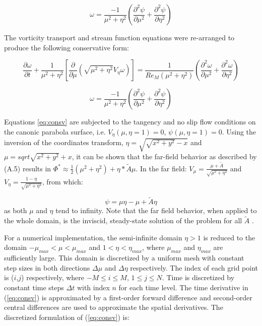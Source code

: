 \documentclass{article}
\newcommand{\pd}{\partial}
\begin{document}
\begin{equation}
\omega = \frac{-1}{\mu^2 + \eta^2} \left(\frac{\pd^2 \psi}{\pd \mu^2} + \frac{\pd^2 \psi}{\pd \eta^2} \right)
\end{equation}

The vorticity transport and stream function equations were re-arranged to produce the following conservative form:

\[
\frac{\pd \omega}{\pd t} + \frac{1}{\mu^2 + \eta^2} \left[\frac{\pd}{\pd \mu} \left(\sqrt{\mu^2 + \eta^2} V_\eta \omega \right) \right] = \frac{1}{Re_M(\mu^2 + \eta^2)} \left(\frac{\pd^2 \omega}{\pd \mu^2} + \frac{\pd^2 \omega}{\pd \eta^2} \right)
\]

\begin{equation}
\omega = \frac{-1}{\mu^2 + \eta^2} \left(\frac{\pd^2 \psi}{\pd \mu^2} + \frac{\pd^2 \psi}{\pd \eta^2} \right)
\label{eq:consv}
\end{equation}

Equations \ref{eq:consv} are subjected to the tangency and no slip flow conditions on the canonic parabola surface, i.e. $V_\eta(\mu,\eta=1) = 0$, $\psi(\mu,\eta=1) = 0$. Using the inversion of the coordinates transform, $\eta = \sqrt{ \sqrt{x^2+y^2} - x}$ and $\mu = sqrt{ \sqrt{x^2+y^2} + x}$, it can be shown that the far-field behavior as described by (A.5) results in
$\Phi^* \approx \frac{1}{2} (\mu^2+\eta^2) + \eta * \tilde{A}\mu$.
In the far field:
$V_\mu = \frac{\mu + \tilde{A}}{\sqrt{\mu^2 + \eta^2}}$ and $V_\eta = \frac{1 - \eta}{\sqrt{\mu^2 + \eta^2}}$, from which:

\begin{equation}
\psi = \mu\eta - \mu + \tilde{A}\eta
\end{equation}
%
as both $\mu$ and $\eta$ tend to infinity. Note that the far field behavior, when applied to the whole domain, is the inviscid, steady-state solution of the problem for all $\tilde{A}$ .

For a numerical implementation, the semi-infinite domain $\eta > 1$ is reduced to the domain $-\mu_{max} < \mu < \mu_{max}$ and $1 < \eta < \eta_{max}$, where $\mu_{max}$ and $\eta_{max}$ are sufficiently large. This domain is discretized by a uniform mesh with constant step sizes in both directions $\Delta \mu$ and $\Delta \eta$ respectively. The index of each grid point is ($i$,$j$) respectively, where $-M \le i \le M$, $1 \le j \le N$. Time is discretized by constant time steps $\Delta t$ with index $n$ for each time level. The time
derivative in
(\ref{eq:consv})
is approximated by a first-order forward difference and second-order central
differences are used to approximate the spatial derivatives. The discretized formulation of (\ref{eq:consv}) is:
\end{document}
